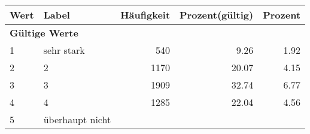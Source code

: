      \begin{longtable}{lXrrr}
     \toprule
     \textbf{Wert} & \textbf{Label} & \textbf{Häufigkeit} & \textbf{Prozent(gültig)} & \textbf{Prozent} \\
     \endhead
     \midrule
     \multicolumn{5}{l}{\textbf{Gültige Werte}}\\

     1 &
     \multicolumn{1}{X}{ sehr stark   } &


       \num{540} &
       \num[round-mode=places,round-precision=2]{9,26} &
         \num[round-mode=places,round-precision=2]{1,92} \\

     2 &
     \multicolumn{1}{X}{ 2   } &


       \num{1170} &
       \num[round-mode=places,round-precision=2]{20,07} &
         \num[round-mode=places,round-precision=2]{4,15} \\

     3 &
     \multicolumn{1}{X}{ 3   } &


       \num{1909} &
       \num[round-mode=places,round-precision=2]{32,74} &
         \num[round-mode=places,round-precision=2]{6,77} \\

     4 &
     \multicolumn{1}{X}{ 4   } &


       \num{1285} &
       \num[round-mode=places,round-precision=2]{22,04} &
         \num[round-mode=places,round-precision=2]{4,56} \\

     5 &
     \multicolumn{1}{X}{ überhaupt nicht   } &



\end{longtable}
